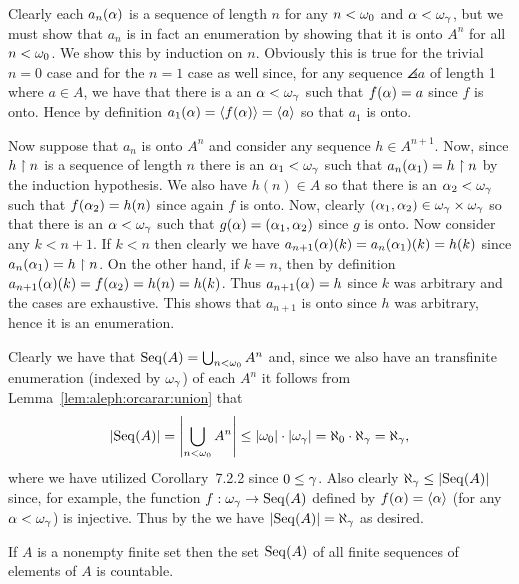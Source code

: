 {{  Clearly each $a_n(\alpha)$ is a sequence of length $n$ for any $n < \omega_0$ and $\alpha < \omega_\gamma$, but we must show that $a_n$ is in fact an enumeration by showing that it is onto $A^n$ for all $n < \omega_0$.
  We show this by induction on $n$.
  Obviously this is true for the trivial $n=0$ case and for the $n=1$ case as well since, for any sequence $\angles{a}$ of length 1 where $a \in A$, we have that there is a an $\alpha < \omega_\gamma$ such that $f(\alpha) = a$ since $f$ is onto.
  Hence by definition $a_1(\alpha) = \left\langle f(\alpha) \right\rangle = \left\langle a \right\rangle$ so that $a_1$ is onto.

  Now suppose that $a_n$ is onto $A^n$ and consider any sequence $h \in A^{n+1}$.
  Now, since $h \restriction n$ is a sequence of length $n$ there is an $\alpha_1 < \omega_\gamma$ such that $a_n(\alpha_1) = h \restriction n$ by the induction hypothesis.
  We also have $h(n) \in A$ so that there is an $\alpha_2 < \omega_\gamma$ such that $f(\alpha_2) = h(n)$ since again $f$ is onto.
  Now, clearly $(\alpha_1, \alpha_2) \in \omega_\gamma \times \omega_\gamma$ so that there is an $\alpha < \omega_\gamma$ such that $g(\alpha) = (\alpha_1, \alpha_2)$ since $g$ is onto.
  Now consider any $k < n+1$.
  If $k < n$ then clearly we have $a_{n+1}(\alpha)(k) = a_n(\alpha_1)(k) = h(k)$ since $a_n(\alpha_1) = h \restriction n$.
  On the other hand, if $k = n$, then by definition $a_{n+1}(\alpha)(k) = f(\alpha_2) = h(n) = h(k)$.
  Thus $a_{n+1}(\alpha) = h$ since $k$ was arbitrary and the cases are exhaustive.
  This shows that $a_{n+1}$ is onto since $h$ was arbitrary, hence it is an enumeration.

  Clearly we have that $\mathrm{Seq}(A) = \bigcup_{n < \omega_0} A^n$ and, since we also have an transfinite enumeration (indexed by $\omega_\gamma$) of each $A^n$ it follows from Lemma~\ref{lem:aleph:orcarar:union} that
  $$
    \left| \mathrm{Seq}(A) \right| = \left| \bigcup_{n < \omega_0} A^n \right| \leq \left| \omega_0 \right| \cdot \left| \omega_\gamma \right| = \aleph_0 \cdot \aleph_\gamma = \aleph_\gamma,
  $$
  where we have utilized Corollary~7.2.2 since $0 \leq \gamma$.
  Also clearly $\aleph_\gamma \leq \left| \mathrm{Seq}(A) \right|$ since, for example, the function $f: \omega_\gamma \to \mathrm{Seq}(A)$ defined by $f(\alpha) = \left\langle \alpha \right\rangle$ (for any $\alpha < \omega_\gamma$) is injective.
  Thus by the \cbthrm{} we have $\left| \mathrm{Seq}(A) \right| = \aleph_\gamma$ as desired.
}

\begin{cor}\label{cor:aleph:orcarar:seqfin}
  If $A$ is a nonempty finite set then the set $\mathrm{Seq}(A)$ of all finite sequences of elements of $A$ is countable.
\end{cor}
}
